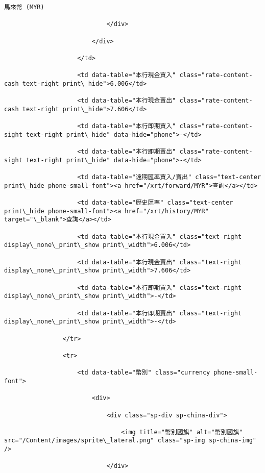 \documentclass[11pt]{article}
\begin{document}
\begin{Verbatim}[commandchars=\\\{\}]
                                馬來幣 (MYR)

                            </div>

                        </div>

                    </td>

                    <td data-table="本行現金買入" class="rate-content-cash text-right print\_hide">6.006</td>

                    <td data-table="本行現金賣出" class="rate-content-cash text-right print\_hide">7.606</td>

                    <td data-table="本行即期買入" class="rate-content-sight text-right print\_hide" data-hide="phone">-</td>

                    <td data-table="本行即期賣出" class="rate-content-sight text-right print\_hide" data-hide="phone">-</td>

                    <td data-table="遠期匯率買入/賣出" class="text-center print\_hide phone-small-font"><a href="/xrt/forward/MYR">查詢</a></td>

                    <td data-table="歷史匯率" class="text-center print\_hide phone-small-font"><a href="/xrt/history/MYR" target="\_blank">查詢</a></td>

                    <td data-table="本行現金買入" class="text-right display\_none\_print\_show print\_width">6.006</td>

                    <td data-table="本行現金賣出" class="text-right display\_none\_print\_show print\_width">7.606</td>

                    <td data-table="本行即期買入" class="text-right display\_none\_print\_show print\_width">-</td>

                    <td data-table="本行即期賣出" class="text-right display\_none\_print\_show print\_width">-</td>

                </tr>

                <tr>

                    <td data-table="幣別" class="currency phone-small-font">

                        <div>

                            <div class="sp-div sp-china-div">

                                <img title="幣別國旗" alt="幣別國旗" src="/Content/images/sprite\_lateral.png" class="sp-img sp-china-img" />

                            </div>


\end{Verbatim}
\end{document}
